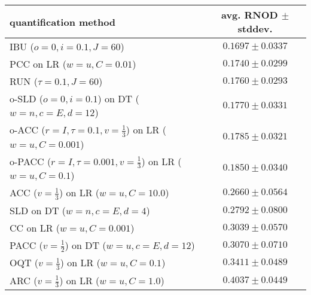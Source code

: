 \begin{tabular}{lc}
  \toprule
  quantification method & avg. RNOD $\pm$ stddev. \\
  \midrule
  IBU ($o=0, i=0.1, J=60$) & $\mathbf{0.1697 \pm 0.0337}$ \\
  PCC on LR ($w=u, C=0.01$) & $0.1740 \pm 0.0299$ \\
  RUN ($\tau=0.1, J=60$) & $0.1760 \pm 0.0293$ \\
  o-SLD ($o=0, i=0.1$) on DT ($w=n, c=E, d=12$) & $0.1770 \pm 0.0331$ \\
  o-ACC ($r=I, \tau=0.1, v=\frac{1}{3}$) on LR ($w=u, C=0.001$) & $0.1785 \pm 0.0321$ \\
  o-PACC ($r=I, \tau=0.001, v=\frac{1}{3}$) on LR ($w=u, C=0.1$) & $0.1850 \pm 0.0340$ \\
  ACC ($v=\frac{1}{3}$) on LR ($w=u, C=10.0$) & $0.2660 \pm 0.0564$ \\
  SLD on DT ($w=n, c=E, d=4$) & $0.2792 \pm 0.0800$ \\
  CC on LR ($w=u, C=0.001$) & $0.3039 \pm 0.0570$ \\
  PACC ($v=\frac{1}{2}$) on DT ($w=u, c=E, d=12$) & $0.3070 \pm 0.0710$ \\
  OQT ($v=\frac{1}{3}$) on LR ($w=u, C=0.1$) & $0.3411 \pm 0.0489$ \\
  ARC ($v=\frac{1}{3}$) on LR ($w=u, C=1.0$) & $0.4037 \pm 0.0449$ \\
  \bottomrule
\end{tabular}
